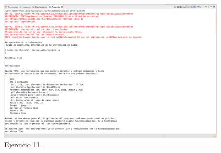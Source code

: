 \documentclass{article}
\begin{document}
\begin{enumerate}
\begin{enumerate}
\begin{figure}[H]
                \centering
                \includegraphics[width=0.7\linewidth]{./ej20}
                \caption{Ejercicio 11.}
                \end{figure}
        \end{enumerate}
\end{enumerate}
\end{document}
